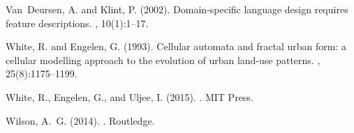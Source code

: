 \documentclass[10pt]{article}
\begin{document}
\begin{thebibliography}{}
Van~Deursen, A. and Klint, P. (2002).
\newblock Domain-specific language design requires feature descriptions.
, 10(1):1--17.

White, R. and Engelen, G. (1993).
\newblock Cellular automata and fractal urban form: a cellular modelling
  approach to the evolution of urban land-use patterns.
, 25(8):1175--1199.

White, R., Engelen, G., and Uljee, I. (2015).
.
\newblock MIT Press.

Wilson, A.~G. (2014).
.
\newblock Routledge.

\end{thebibliography}
\end{document}
